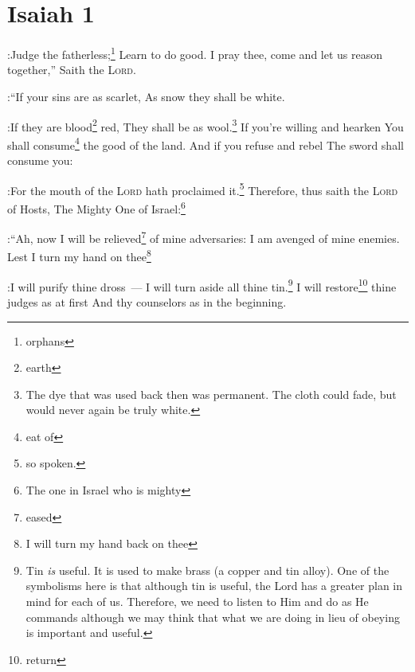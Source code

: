 \section{Isaiah 1}\label{Isaiah 1}
\begin{enumerate}
    
    :Judge the fatherless;\footnote{orphans} Learn to do good.%
     I pray thee, come and let us reason together,'' Saith the \textsc{Lord}.%

:``If your sins are as scarlet, As snow they shall be white.%

:If they are blood\footnote{earth} red, They shall be as wool.\footnote{The dye that was used back then was permanent. The cloth could fade, but would never again be truly white.}%
     If you're willing and hearken You shall consume\footnote{eat of} the good of the land.%
     And if you refuse and rebel The sword shall consume you:%

:For the mouth of the \textsc{Lord} hath proclaimed it.\footnote{so spoken.}%
     Therefore, thus saith the \textsc{Lord} of Hosts, The Mighty One of Israel:\footnote{The one in Israel who is mighty}%

:``Ah, now I will be relieved\footnote{eased} of mine adversaries: I am avenged of mine enemies.%
     Lest I turn my hand on thee\footnote{I will turn my hand back on thee}%

:I will purify thine dross~--- I will turn aside all thine tin.\footnote{Tin \emph{is} useful. It is used to make brass (a copper and tin alloy). One of the symbolisms here is that although tin is useful, the Lord has a greater plan in mind for each of us. Therefore, we need to listen to Him and do as He commands although we may think that what we are doing in lieu of obeying is important and useful.}%
     I will restore\footnote{return} thine judges as at first And thy counselors as in the beginning.%


\end{enumerate}
